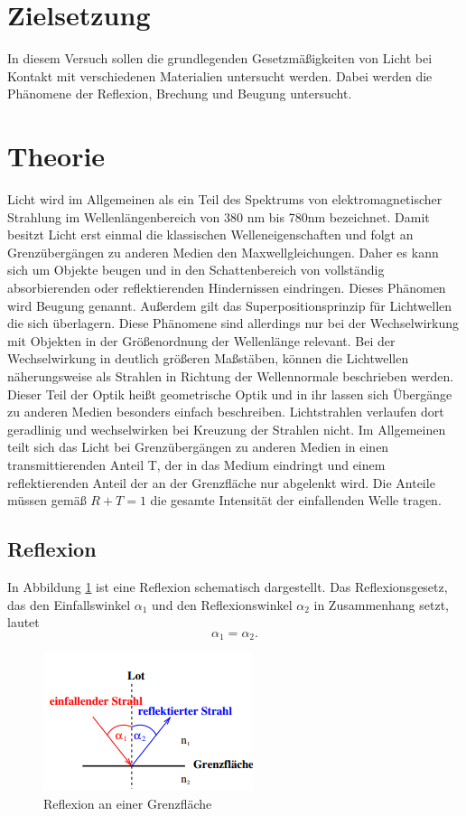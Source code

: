 \section{Zielsetzung}
\noindent In diesem Versuch sollen die grundlegenden Gesetzmäßigkeiten von Licht bei Kontakt mit verschiedenen
Materialien untersucht werden. Dabei werden die Phänomene der Reflexion, Brechung und Beugung untersucht.
\section{Theorie}
\label{sec:Theorie}
\noindent Licht wird im Allgemeinen als ein Teil des Spektrums von elektromagnetischer Strahlung im Wellenlängenbereich
von 380 nm bis 780nm bezeichnet. Damit besitzt Licht erst einmal die klassischen Welleneigenschaften und folgt an Grenzübergängen
zu anderen Medien den Maxwellgleichungen. Daher es kann sich um Objekte
beugen und in den Schattenbereich von vollständig absorbierenden oder reflektierenden Hindernissen eindringen. Dieses Phänomen wird Beugung
genannt. Außerdem gilt das Superpositionsprinzip für Lichtwellen die sich überlagern. Diese Phänomene sind allerdings nur bei
der Wechselwirkung mit Objekten in der Größenordnung der Wellenlänge relevant. Bei der Wechselwirkung in deutlich größeren Maßstäben,
können die Lichtwellen näherungsweise als Strahlen in Richtung der Wellennormale beschrieben werden. Dieser Teil der Optik heißt geometrische Optik
und in ihr lassen sich Übergänge zu anderen Medien besonders einfach beschreiben. Lichtstrahlen verlaufen dort geradlinig und wechselwirken bei Kreuzung der Strahlen nicht.
Im Allgemeinen teilt sich das Licht bei 
Grenzübergängen zu anderen Medien in einen transmittierenden Anteil T, der in das Medium eindringt und einem reflektierenden
Anteil der an der Grenzfläche nur abgelenkt wird. Die Anteile müssen gemäß $R+T=1$ die gesamte Intensität der einfallenden Welle 
tragen.
\subsection{Reflexion}
In Abbildung \ref{fig:Ref} ist eine Reflexion schematisch dargestellt.
Das Reflexionsgesetz, das den Einfallswinkel $\alpha_1$ und den Reflexionswinkel $\alpha_2$ in Zusammenhang
setzt, lautet
\begin{equation}
    \alpha_1=\alpha_2.
    \label{eq:Reflexion}
\end{equation}
\begin{figure}
    \centering
    \includegraphics{content/Reflexion.png}
    \caption{Reflexion an einer Grenzfläche\cite{V400}}
    \label{fig:Ref}
\end{figure}

